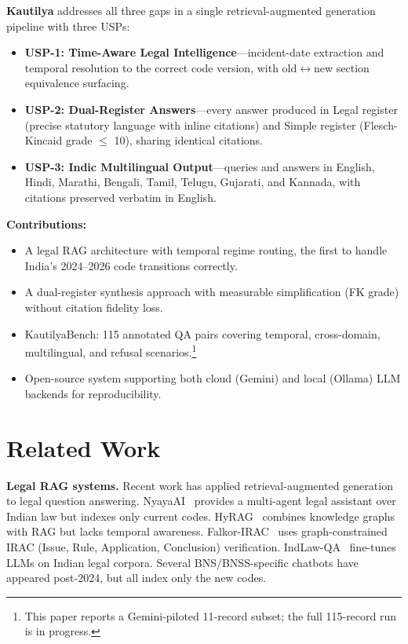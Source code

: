 \documentclass[conference]{IEEEtran}
\begin{document}
\textbf{Kautilya} addresses all three gaps in a single retrieval-augmented generation pipeline with three USPs:

\begin{itemize}
    \item \textbf{USP-1: Time-Aware Legal Intelligence}---incident-date extraction and temporal resolution to the correct code version, with old$\leftrightarrow$new section equivalence surfacing.
    \item \textbf{USP-2: Dual-Register Answers}---every answer produced in Legal register (precise statutory language with inline citations) and Simple register (Flesch-Kincaid grade $\leq$ 10), sharing identical citations.
    \item \textbf{USP-3: Indic Multilingual Output}---queries and answers in English, Hindi, Marathi, Bengali, Tamil, Telugu, Gujarati, and Kannada, with citations preserved verbatim in English.
\end{itemize}

\textbf{Contributions:}
\begin{itemize}
    \item A legal RAG architecture with temporal regime routing, the first to handle India's 2024--2026 code transitions correctly.
    \item A dual-register synthesis approach with measurable simplification (FK grade) without citation fidelity loss.
    \item KautilyaBench: 115 annotated QA pairs covering temporal, cross-domain, multilingual, and refusal scenarios.\footnote{This paper reports a Gemini-piloted 11-record subset; the full 115-record run is in progress.}
    \item Open-source system supporting both cloud (Gemini) and local (Ollama) LLM backends for reproducibility.
\end{itemize}

\section{Related Work}
\label{sec:related}

\textbf{Legal RAG systems.} Recent work has applied retrieval-augmented generation to legal question answering. NyayaAI~\cite{nyayaai} provides a multi-agent legal assistant over Indian law but indexes only current codes. HyRAG~\cite{hyrag} combines knowledge graphs with RAG but lacks temporal awareness. Falkor-IRAC~\cite{falkor} uses graph-constrained IRAC (Issue, Rule, Application, Conclusion) verification. IndLaw-QA~\cite{indlawqa} fine-tunes LLMs on Indian legal corpora. Several BNS/BNSS-specific chatbots have appeared post-2024, but all index only the new codes.
\end{document}
